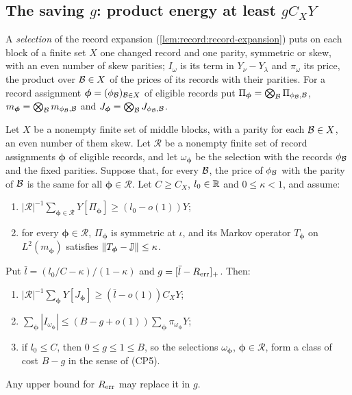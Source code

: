 \subsection{The saving \texorpdfstring{$g$}{g}: product energy at least \texorpdfstring{$gC_XY$}{gC\_XY}}\label{subsec:variance:gain}

A \emph{selection} of the record expansion (\cref{lem:record:record-expansion})
puts on each block of a finite set $X$ one changed record and one parity,
symmetric or skew, with an even number of skew parities; $I_\omega$ is its
term in $Y_\nu-Y_\lambda$ and $\pi_\omega$ its price, the product over $\mathcal B\in X$
of the prices of its records with their parities. For a record assignment
$\boldsymbol\phi=(\phi_\mathcal B)_{\mathcal B\in X}$ of eligible records put
$\Pi_{\boldsymbol\phi}=\bigotimes_\mathcal B\Pi_{\phi_\mathcal B,\mathcal B}$,
$m_{\boldsymbol\phi}=\bigotimes_\mathcal B m_{\phi_\mathcal B,\mathcal B}$ and
$J_{\boldsymbol\phi}=\bigotimes_\mathcal B J_{\phi_\mathcal B,\mathcal B}$.

\begin{lemma}\label{lem:var-gain}
Let $X$ be a nonempty finite set of middle blocks, with a parity for each
$\mathcal B\in X$, an even number of them skew. Let $\mathcal R$ be a nonempty finite
set of record assignments $\boldsymbol\phi$ of eligible records, and let
$\omega_{\boldsymbol\phi}$ be the selection with the records $\phi_\mathcal B$ and the
fixed parities. Suppose that, for every $\mathcal B$, the price of $\phi_\mathcal B$ with
the parity of $\mathcal B$ is the same for all $\boldsymbol\phi\in\mathcal R$. Let
$C\ge C_X$, $l_0\in\mathbb R$ and $0\le\kappa<1$, and assume:
\begin{enumerate}[label=(\textup{\Roman*})]
\item[\textup{(Res)}] $|\mathcal R|^{-1}\sum_{\boldsymbol\phi\in\mathcal R}
 Y[\Pi_{\boldsymbol\phi}]\ge(l_0-o(1))Y$;
\item[\textup{(Cen)}] for every $\boldsymbol\phi\in\mathcal R$, $\Pi_{\boldsymbol\phi}$
 is symmetric at $\iota$, and its Markov operator $T_{\boldsymbol\phi}$ on
 $L^2(m_{\boldsymbol\phi})$ satisfies $\|T_{\boldsymbol\phi}-\mathbb J\|\le\kappa$.
\end{enumerate}
Put $\bar l=(l_0/C-\kappa)/(1-\kappa)$ and $g=[\bar l-R_{\rm err}]_+$. Then:
\begin{enumerate}[label=(\alph*)]
\item $|\mathcal R|^{-1}\sum_{\boldsymbol\phi}Y[J_{\boldsymbol\phi}]\ge
 (\bar l-o(1))C_XY$;
\item $\sum_{\boldsymbol\phi}|I_{\omega_{\boldsymbol\phi}}|\le(B-g+o(1))
 \sum_{\boldsymbol\phi}\pi_{\omega_{\boldsymbol\phi}}Y$;
\item if $l_0\le C$, then $0\le g\le1\le B$, so the selections
 $\omega_{\boldsymbol\phi}$, $\boldsymbol\phi\in\mathcal R$, form a class of cost
 $B-g$ in the sense of (CP5).
\end{enumerate}
Any upper bound for $R_{\rm err}$ may replace it in $g$.
\end{lemma}

